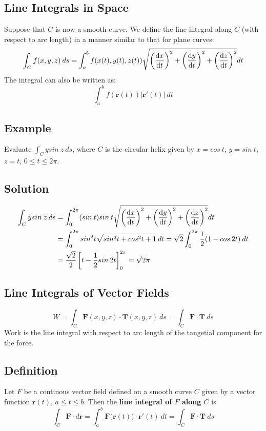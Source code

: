 \subsection*{Line Integrals in Space}
Suppose that $C$ is now a smooth curve. We define the line integral along $C$
(with respect to arc length) in a manner similar to that for plane curves:
$$\int_Cf(x,y,z)\:ds=\int_a^bf(x(t),y(t),z(t))\sqrt{\left(\dv{x}{t}\right)^2+
                \left(\dv{y}{t}\right)^2+\left(\dv{z}{t}\right)^2}dt$$
The integral can also be written as:
$$\int_a^bf(\textbf{r}(t))|\textbf{r}'(t)|\:dt$$

\subsection*{Example}
Evaluate $\int_Cysin\:z\:ds$, where $C$ is the circular helix given by $x=cos\:t$,
$y=sin\:t$, $z=t$, $0\leq t\leq 2\pi$.

\subsection*{Solution}
\begin{align*}
        \int_Cysin\:z\:ds & =\int_0^{2\pi}(sin\:t)sin\:t\sqrt{\left(\dv{x}{t}\right)^2+\left(\dv{y}{t}\right)^2+\left(\dv{z}{t}\right)^2}dt \\
                          & =\int_0^{2\pi}sin^2t\sqrt{sin^2t+cos^2t+1}\:dt=\sqrt{2}\int_0^{2\pi}\frac{1}{2}(1-cos\:2t)\:dt                  \\
                          & =\frac{\sqrt{2}}{2}\left[t-\frac{1}{2}sin\:2t\right]_0^{2\pi}=\sqrt{2}\pi
\end{align*}

\subsection*{Line Integrals of Vector Fields}
$$W=\int_C\textbf{F}(x,y,z)\cdot\textbf{T}(x,y,z)\:ds=\int_C\textbf{F}\cdot\textbf{T}\:ds$$
Work is the line integral with respect to arc length of the tangetial component
for the force.

\subsection*{Definition}
Let $F$ be a continous vector field defined on a smooth curve $C$ given by a vector
function $\textbf{r}(t)$, $a\leq t\leq b$. Then the \textbf{line integral of $F$
        along $C$} is
$$\int_C\textbf{F}\cdot d\textbf{r}=\int_a^b\mathbf{F(r}(t))\cdot\textbf{r}'(t)\:dt=\int_C\mathbf{F\cdot T}\:ds$$

